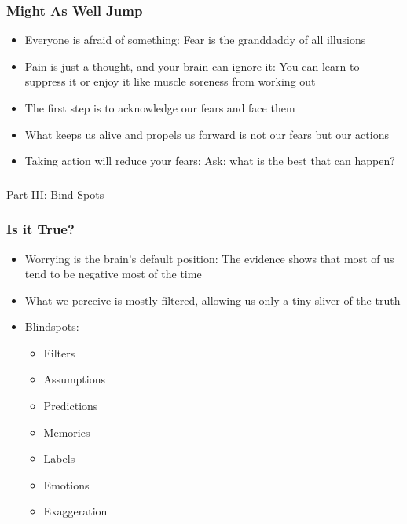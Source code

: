 \begin{frame}[fragile]\frametitle{Might As Well Jump}
\begin{itemize}
\item Everyone is afraid of something: Fear is the granddaddy of all illusions
\item Pain is just a thought, and your brain can ignore it: You can learn to suppress it or enjoy it like muscle soreness from working out
\item The first step is to acknowledge our fears and face them
\item What keeps us alive and propels us forward is not our fears but our actions
\item Taking action will reduce your fears: Ask: what is the best that can happen?
\end{itemize}
\end{frame}

\begin{frame}[fragile]\frametitle{}
\begin{center}
{\Large Part III: Bind Spots}
\end{center}
\end{frame}

\begin{frame}[fragile]\frametitle{Is it True?}
\begin{itemize}
\item Worrying is the brain’s default position: The evidence shows that most of us tend to be negative most of the time
\item What we perceive is mostly filtered, allowing us only a tiny sliver of the truth
\item Blindspots:
	\begin{itemize}
	\item Filters
	\item Assumptions
	\item Predictions
	\item Memories
	\item Labels
	\item Emotions
	\item Exaggeration
	\end{itemize}
\end{itemize}

\end{frame}

